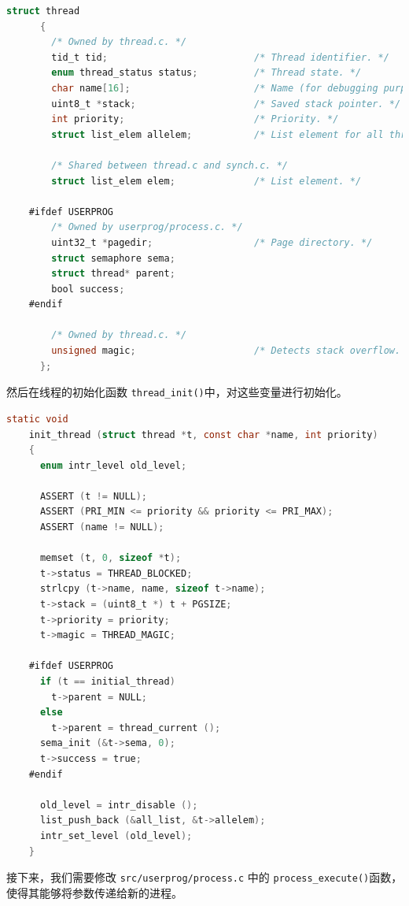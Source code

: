 \documentclass{article}
\begin{document}
\begin{lstlisting}[language=C, title={\texttt{src/threads/thread.h}}]
    struct thread
      {
        /* Owned by thread.c. */
        tid_t tid;                          /* Thread identifier. */
        enum thread_status status;          /* Thread state. */
        char name[16];                      /* Name (for debugging purposes). */
        uint8_t *stack;                     /* Saved stack pointer. */
        int priority;                       /* Priority. */
        struct list_elem allelem;           /* List element for all threads list. */

        /* Shared between thread.c and synch.c. */
        struct list_elem elem;              /* List element. */

    #ifdef USERPROG
        /* Owned by userprog/process.c. */
        uint32_t *pagedir;                  /* Page directory. */
        struct semaphore sema;
        struct thread* parent;
        bool success;
    #endif

        /* Owned by thread.c. */
        unsigned magic;                     /* Detects stack overflow. */
      };
\end{lstlisting}

然后在线程的初始化函数 \texttt{thread\_init()}中，对这些变量进行初始化。

\begin{lstlisting}[language=C, title={\texttt{src/threads/thread.c}}]
    static void
    init_thread (struct thread *t, const char *name, int priority)
    {
      enum intr_level old_level;
    
      ASSERT (t != NULL);
      ASSERT (PRI_MIN <= priority && priority <= PRI_MAX);
      ASSERT (name != NULL);
    
      memset (t, 0, sizeof *t);
      t->status = THREAD_BLOCKED;
      strlcpy (t->name, name, sizeof t->name);
      t->stack = (uint8_t *) t + PGSIZE;
      t->priority = priority;
      t->magic = THREAD_MAGIC;
    
    #ifdef USERPROG
      if (t == initial_thread)
        t->parent = NULL;
      else
        t->parent = thread_current ();
      sema_init (&t->sema, 0);
      t->success = true;
    #endif
    
      old_level = intr_disable ();
      list_push_back (&all_list, &t->allelem);
      intr_set_level (old_level);
    }

\end{lstlisting}

接下来，我们需要修改 \texttt{src/userprog/process.c} 中的 \texttt{process\_execute()}函数，使得其能够将参数传递给新的进程。
\end{document}
